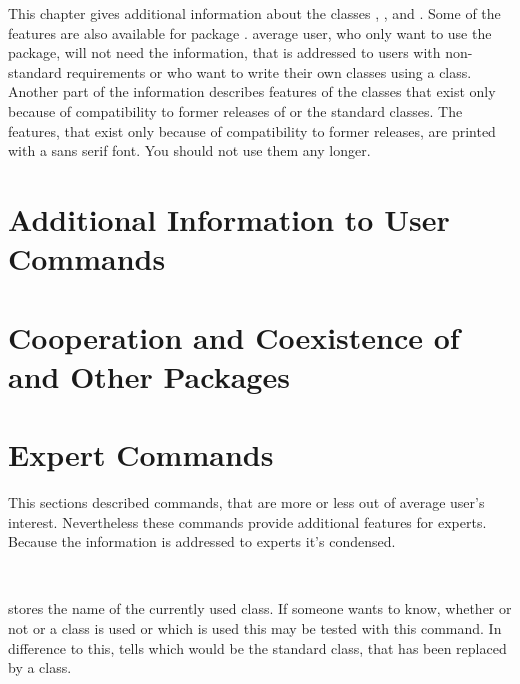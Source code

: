 This chapter gives additional information about the \KOMAScript{} classes
, , and . Some of the features
are also available for package .  average user, who only
want to use the package, will not need the information, that is addressed to
users with non-standard requirements or who want to write their own classes
using a \KOMAScript{} class. Another part of the information describes features
of the classes that exist only because of compatibility to former
releases of \KOMAScript{} or the standard classes. The features, that exist
only because of compatibility to former \KOMAScript{} releases, are printed
with a sans serif font. You should not use them any longer.


\section{Additional Information to User Commands}



\section{Cooperation and Coexistence of \KOMAScript{} and Other Packages}



\section{Expert Commands}

This sections described commands, that are more or less out of average user's
interest. Nevertheless these commands provide additional features for
experts. Because the information is addressed to experts it's condensed.


\begin{Declaration}
  \\
\end{Declaration}
%
%
 stores the name of the currently used \KOMAScript{}
class. If someone wants to know, whether or not or a \KOMAScript{} class is
used or which \KOMAScript{} is used this may be tested with this command. In
difference to this,  tells which would be the standard class,
that has been replaced by a \KOMAScript{} class.

